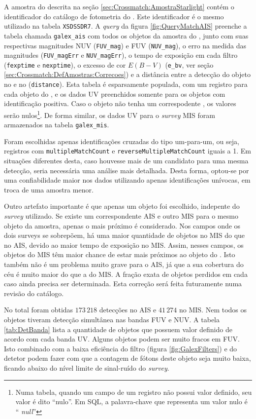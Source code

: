 A amostra do \starlight descrita na seção \ref{sec:Crossmatch:AmostraStarlight}
contém o identificador do catálogo de fotometria do \SDSS. Este identificador é
o mesmo utilizado na tabela \texttt{XSDSSDR7}. A {\em query} da figura
\ref{fig:QueryMatchAIS} preenche a tabela chamada \texttt{galex\_ais} com todos
os objetos da amostra do \starlight, junto com suas respectivas magnitudes NUV
(\texttt{FUV\_mag}) e FUV (\texttt{NUV\_mag}), o erro na medida das magnitudes
({\tt FUV\_magErr} e \texttt{NUV\_magErr}), o tempo de exposição em cada filtro
({\tt fexptime} e \texttt{nexptime}), o excesso de cor $E(B-V)$ (\texttt{e\_bv},
ver seção \ref{sec:Crossmatch:DefAmostras:Correcoes}) e a distância entre a
detecção do objeto no \galex e no \SDSS (\texttt{distance}). Esta tabela é
esparsamente populada, com um registro para cada objeto do \starlight, e os
dados UV preenchidos somente para os objetos com identificação positiva. Caso o
objeto não tenha um correspodente \galex, os valores serão nulos\footnote{Numa
tabela, quando um campo de um registro não possui valor definido, seu valor é
dito ``nulo''. Em SQL, a palavra-chave que representa um valor nulo é ``{\em
null}''}. De forma similar, os dados UV para o {\em survey} MIS foram
armazenados na tabela \texttt{galex\_mis}.

Foram escolhidas apenas identificações cruzadas do tipo um-para-um, ou seja,
registros com \texttt{multipleMatchCount} e \texttt{reverseMultipleMatchCount}
iguais a 1. Em situações diferentes desta, caso houvesse mais de um candidato
para uma mesma detecção, seria necessária uma análise mais detalhada. Desta
forma, optou-se por uma confiabilidade maior nos dados utilizando apenas
identificações unívocas, em troca de uma amostra menor.

Outro artefato importante é que apenas um objeto foi escolhido, indepente do
{\em survey} \galex utilizado. Se existe um correspondente AIS e outro MIS para
o mesmo objeto da amostra, apenas o mais próximo é considerado. Nos campos onde
os dois {surveys} se sobrepõem, há uma maior quantidade de objetos no MIS do que
no AIS, devido ao maior tempo de exposição no MIS. Assim, nesses campos, os
objetos do MIS têm maior chance de estar mais próximos ao objeto do \SDSS. Isto
também não é um problema muito grave para o AIS, já que a sua cobertura do céu é
muito maior do que a do MIS. A fração exata de objetos perdidos em cada caso
ainda precisa ser determinada. Esta correção será feita futuramente numa revisão
do catálogo.

No total foram obtidas $173\,218$ detecções no AIS e $41\,274$ no MIS. Nem todos
os objetos tiveram detecção simultânea nas bandas FUV e NUV. A tabela
\ref{tab:DetBanda} lista a quantidade de objetos que possuem valor definido de
acordo com cada banda UV. Alguns objetos podem ser muito fracos em FUV. Isto
combinado com a baixa eficiência do filtro (figura \ref{fig:GalexFilters}) e do
detetor podem fazer com que a contagem de fótons deste objeto seja muito baixa,
ficando abaixo do nível limite de sinal-ruído do {\em survey}.

